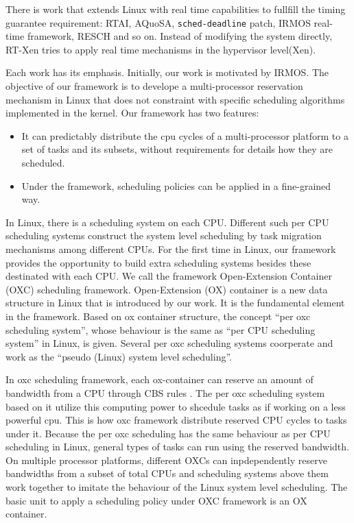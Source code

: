 There is work that extends Linux with real time capabilities to fullfill 
the timing guarantee requirement: RTAI\cite{rtai}, AQuoSA\cite{Luigi09}, 
\texttt{sched-deadline} patch\cite{Dario09}, 
IRMOS real-time framework, RESCH and so on.
Instead of modifying the system directly, RT-Xen tries to apply real 
time mechanisms in the hypervisor level(Xen). 

Each work has its emphasis. Initially, our work is motivated by
IRMOS. 
The objective of our framework is to develope a multi-processor reservation
mechanism in Linux that does not constraint with specific scheduling 
algorithms implemented in the kernel.
Our framework has two features:
\begin{itemize}
\item It can predictably distribute the cpu cycles of a
  multi-processor platform to a set of tasks and its subsets, without
  requirements for details how they are scheduled.
\item Under the framework, scheduling policies can be applied in a
  fine-grained way.
\end{itemize}


In Linux, there is a scheduling system on each CPU. Different such per
CPU scheduling systems construct the system level scheduling by task
migration mechanisms among different CPUs. For the first time in
Linux, our framework provides the opportunity to build extra
scheduling systems besides these destinated with each CPU. We call the
framework Open-Extension Container (OXC) scheduling
framework. Open-Extension (OX) container is a new data structure in
Linux that is introduced by our work.  It is the fundamental element
in the framework. Based on ox container structure, the concept ``per
oxc scheduling system'', whose behaviour is the same as ``per CPU
scheduling system'' in Linux, is given. Several per oxc scheduling
systems coorperate and work as the ``pseudo (Linux) system level
scheduling''.

In oxc scheduling framework, each ox-container can reserve an amount
of bandwidth from a CPU through CBS rules \cite{AbeniB98}. The per oxc
scheduling system based on it utilize this computing power to shcedule
tasks as if working on a less powerful cpu. This is how oxc framework
distribute reserved CPU cycles to tasks under it. Because the per oxc
scheduling has the same behaviour as per CPU scheduling in Linux,
general types of tasks can run using the reserved bandwidth. On
multiple processor platforms, different OXCs can inpdependently
reserve bandwidths from a subset of total CPUs and scheduling systems
above them work together to imitate the behaviour of the Linux system
level scheduling. The basic unit to apply a scheduling policy under
OXC framework is an OX container.
